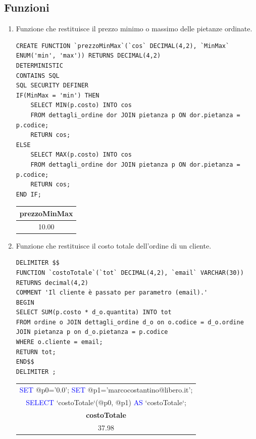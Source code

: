 \documentclass[10pt]{article}
\begin{document}
		\subsection{Funzioni}
		\begin{enumerate}[noitemsep]
		\item Funzione che restituisce il prezzo minimo o massimo delle pietanze ordinate.
		\begin{lstlisting}[style=Mysql]
CREATE FUNCTION `prezzoMinMax`(`cos` DECIMAL(4,2), `MinMax` ENUM('min', 'max')) RETURNS DECIMAL(4,2)
DETERMINISTIC 
CONTAINS SQL 
SQL SECURITY DEFINER 
IF(MinMax = 'min') THEN
	SELECT MIN(p.costo) INTO cos
	FROM dettagli_ordine dor JOIN pietanza p ON dor.pietanza = p.codice; 
	RETURN cos;
ELSE
	SELECT MAX(p.costo) INTO cos
	FROM dettagli_ordine dor JOIN pietanza p ON dor.pietanza = p.codice; 
	RETURN cos;
END IF;
\end{lstlisting}
\begin{center}
	\begin{table}[H]
	\centering
	\label{table:query2}
	\begin{tabular}{|c|}
		\hline
		\textbf{prezzoMinMax} \\ \hline
		10.00 \\ \hline
	\end{tabular}
\end{table}
\end{center}
		\item Funzione che restituisce il costo totale dell'ordine di un cliente.
\begin{lstlisting}[style=Mysql]
DELIMITER $$
FUNCTION `costoTotale`(`tot` DECIMAL(4,2), `email` VARCHAR(30)) RETURNS decimal(4,2)
COMMENT 'Il cliente è passato per parametro (email).'
BEGIN
SELECT SUM(p.costo * d_o.quantita) INTO tot
FROM ordine o JOIN dettagli_ordine d_o on o.codice = d_o.ordine JOIN pietanza p on d_o.pietanza = p.codice
WHERE o.cliente = email;
RETURN tot;
END$$
DELIMITER ;
\end{lstlisting}
\begin{center}
		\begin{table}[H]
		\centering
		\label{table:query3}
		\begin{tabular}{|c|}
			\hline
			\textcolor{blue}{SET} \textcolor{amber(sae/ece)}{@}p0='0.0'; \textcolor{blue}{SET} \textcolor{amber(sae/ece)}{@}p1='marcocostantino@libero.it';\\ \textcolor{blue}{SELECT} `costoTotale`(\textcolor{amber(sae/ece)}{@}p0, \textcolor{amber(sae/ece)}{@}p1) \textcolor{blue}{AS} `costoTotale`; \\ \hline
			 \textbf{costoTotale} \\ \hline
			 37.98 \\ \hline
		\end{tabular}
	\end{table}
\end{center}
\end{enumerate}
\end{document}
